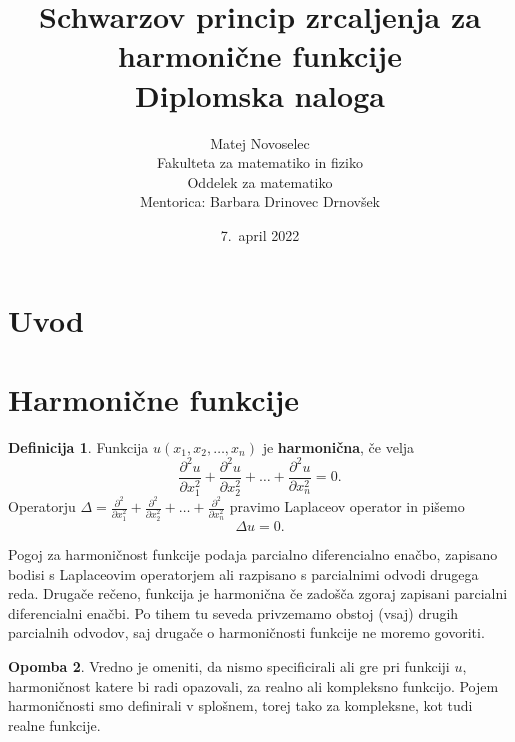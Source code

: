 \documentclass{article}
\begin{document}
\title{Schwarzov princip zrcaljenja za harmonične funkcije\\
    \Large Diplomska naloga
}
\author{
    Matej Novoselec\\
    Fakulteta za matematiko in fiziko\\
    Oddelek za matematiko\\
    Mentorica: Barbara Drinovec Drnovšek
}
\date{7.\ april 2022}


\theoremstyle{definition}
\newtheorem{defi}{Definicija}[section]
\theoremstyle{definition}
\newtheorem{op}[defi]{Opomba}
\newtheorem{trditev}{Trditev}[section]
\newtheorem{pro}{Problem}[section]
\newtheorem{lema}{Lema}[section]
\newtheorem{izrek}{Izrek}[section]
\newtheorem*{kons}{Konstrukcija}

\maketitle


\section{Uvod}

\section{Harmonične funkcije}
    \begin{defi}
        Funkcija $u(x_1, x_2, \dots, x_n)$ je \textbf{harmonična}, če velja
        $$
        \frac{\partial^2 u}{\partial x_1 ^ 2} +  \frac{\partial^2 u}{\partial x_2 ^ 2} + \dots + \frac{\partial^2 u}{\partial x_n ^ 2} = 0.
        $$
        Operatorju $\Delta  = \frac{\partial^2}{\partial x_1 ^ 2} +  \frac{\partial^2}{\partial x_2 ^ 2} + \dots + \frac{\partial^2}{\partial x_n ^ 2}$ pravimo Laplaceov operator in pišemo
        $$
        \Delta u = 0.
        $$
    \end{defi}

    Pogoj za harmoničnost funkcije podaja parcialno diferencialno enačbo, zapisano bodisi s Laplaceovim operatorjem ali razpisano s parcialnimi odvodi drugega reda. Drugače rečeno, funkcija je harmonična če zadošča zgoraj zapisani parcialni diferencialni enačbi. 
    Po tihem tu seveda privzemamo obstoj (vsaj) drugih parcialnih odvodov, saj drugače o harmoničnosti funkcije ne moremo govoriti.

    \begin{op}
        Vredno je omeniti, da nismo specificirali ali gre pri funkciji $u$, harmoničnost katere bi radi opazovali, za realno ali kompleksno funkcijo. 
        Pojem harmoničnosti smo definirali v splošnem, torej tako za kompleksne, kot tudi realne funkcije.
    \end{op}
\end{document}
